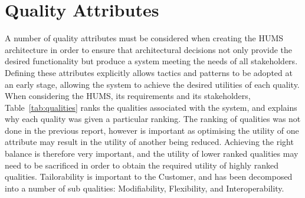 \documentclass[10pt,a4paper]{article}
\begin{document}
\section{Quality Attributes}
\label{sec:qualities}
A number of quality attributes must be considered when creating the HUMS architecture in order to ensure that architectural decisions not only provide the desired functionality but produce a system meeting the needs of all stakeholders.
Defining these attributes explicitly allows tactics and patterns to be adopted at an early stage, allowing the system to achieve the desired utilities of each quality. 
When considering the HUMS, its requirements and its stakeholders, Table~\ref{tab:qualities} ranks the qualities associated with the system, and explains why each quality was given a particular ranking. The ranking of qualities was not done in the previous report, however is important as optimising the utility of one attribute may result in the utility of another being reduced. Achieving the right balance is therefore very important, and the utility of lower ranked qualities may need to be sacrificed in order to obtain the required utility of highly ranked qualities. Tailorability is important to the Customer, and has been decomposed into a number of sub qualities: Modifiability, Flexibility, and Interoperability.
\end{document}
